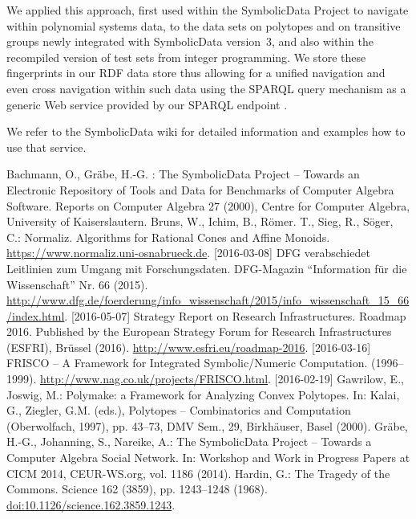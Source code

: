 \documentclass[runningheads,a4paper]{llncs}
\newcommand{\SD}{{\sc Symbo\-lic\-Data}}
\begin{document}
We applied this approach, first used within the {\SD} Project to navigate
within polynomial systems data, to the data sets on polytopes and on transitive
groups newly integrated with {\SD} version~3, and also within the recompiled
version of test sets from integer programming.  We store these fingerprints in
our RDF data store \cite{sdstore} thus allowing for a unified navigation and
even cross navigation within such data using the SPARQL query mechanism as a
generic Web service provided by our SPARQL endpoint \cite{sdsparql}.  

We refer to the {\SD} wiki \cite{sdwiki} for detailed information and examples
how to use that service.

\begin{thebibliography}{4}\raggedright
{} Bachmann, O., Gr\"abe, H.-G. : The SymbolicData Project
  -- Towards an Electronic Repository of Tools and Data for Benchmarks of
  Computer Algebra Software. Reports on Computer Algebra 27 (2000), Centre for
  Computer Algebra, University of Kaiserslautern.
 Bruns, W., Ichim, B., R\"omer. T., Sieg, R., S\"oger, C.:
  Normaliz. Algorithms for Rational Cones and Affine Monoids.
  \url{https://www.normaliz.uni-osnabrueck.de}. [2016-03-08]
 DFG verabschiedet Leitlinien zum Umgang mit Forschungsdaten.
  DFG-Magazin ``Information f\"ur die Wissenschaft'' Nr. 66 (2015).
  \url{http://www.dfg.de/foerderung/info_wissenschaft/2015/info_wissenschaft_15_66/index.html}.
      [2016-05-07]
 Strategy Report on Research Infrastructures.  Roadmap 2016.
  Published by the European Strategy Forum for Research Infrastructures
  (ESFRI), Br\"ussel (2016).  \url{http://www.esfri.eu/roadmap-2016}.
  [2016-03-16]
 FRISCO -- A Framework for Integrated Symbolic/Numeric
  Computation. (1996--1999).  \url{http://www.nag.co.uk/projects/FRISCO.html}.
  [2016-02-19]
 Gawrilow, E., Joswig, M.: Polymake: a Framework for
  Analyzing Convex Polytopes. In: Kalai, G., Ziegler, G.M. (eds.), Polytopes --
  Combinatorics and Computation (Oberwolfach, 1997), pp. 43--73, DMV Sem., 29,
  Birkh\"auser, Basel (2000). 
 Gr\"abe, H.-G., Johanning, S., Nareike, A.: The {\SD} Project
  -- Towards a Computer Algebra Social Network. In: Workshop and Work in
  Progress Papers at CICM 2014, CEUR-WS.org, vol. 1186 (2014).
 Hardin, G.: The Tragedy of the Commons. Science 162 (3859),
  pp. 1243--1248 (1968). \url{doi:10.1126/science.162.3859.1243}. 

\end{thebibliography}
\end{document}
